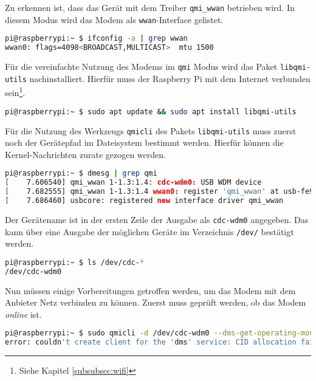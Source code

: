\noindent Zu erkennen ist, dass das Gerät mit dem Treiber \texttt{qmi\_wwan} betrieben wird.
In diesem Modus wird das Modem als \texttt{wwan}-Interface gelistet.

\begin{lstlisting}[language=Bash]
pi@raspberrypi:~ $ ifconfig -a | grep wwan
wwan0: flags=4098<BROADCAST,MULTICAST>  mtu 1500
\end{lstlisting}

\noindent Für die vereinfachte Nutzung des Modems im \texttt{qmi} Modus wird das Paket \texttt{libqmi-utils} nachinstalliert.
Hierfür muss der Raspberry Pi mit dem Internet verbunden sein\footnote{Siehe Kapitel \ref{subsubsec:wifi}}.

\begin{lstlisting}[language=Bash]
pi@raspberrypi:~ $ sudo apt update && sudo apt install libqmi-utils
\end{lstlisting}

\noindent Für die Nutzung des Werkzeugs \texttt{qmicli} des Pakets \texttt{libqmi-utils} muss zuerst noch der Gerätepfad im
Dateisystem bestimmt werden.
Hierfür können die Kernel-Nachrichten zurate gezogen werden.

\begin{lstlisting}[language=Bash]
pi@raspberrypi:~ $ dmesg | grep qmi
[    7.606540] qmi_wwan 1-1.3:1.4: cdc-wdm0: USB WDM device
[    7.682555] qmi_wwan 1-1.3:1.4 wwan0: register 'qmi_wwan' at usb-fe980000.usb-1.3, WWAN/QMI device, 8e:c2:07:55:9c:c3
[    7.686460] usbcore: registered new interface driver qmi_wwan
\end{lstlisting}

\noindent Der Gerätename ist in der ersten Zeile der Ausgabe als \texttt{cdc-wdm0} angegeben.
Das kann über eine Ausgabe der möglichen Geräte im Verzeichnis \texttt{/dev/} bestätigt werden.

\begin{lstlisting}[language=Bash]
pi@raspberrypi:~ $ ls /dev/cdc-*
/dev/cdc-wdm0
\end{lstlisting}



Nun müssen einige Vorbereitungen getroffen werden, um das Modem mit dem Anbieter Netz verbinden zu können.
Zuerst muss geprüft werden, ob das Modem \emph{online} ist.

\begin{lstlisting}[language=Bash]
pi@raspberrypi:~ $ sudo qmicli -d /dev/cdc-wdm0 --dms-get-operating-mode
error: couldn't create client for the 'dms' service: CID allocation failed in the CTL client: Transaction timed out
\end{lstlisting}

